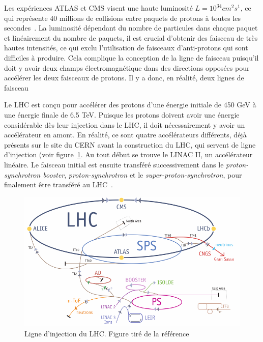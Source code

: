 Les expériences ATLAS et CMS visent une haute luminosité
$L = 10^{34} cm^2 s^1$, ce qui représente 40 millions de collisions
entre paquets de protons à toutes les
secondes~\cite{collaboration_atlas_2008}. La luminosité dépendant du
nombre de particules dans chaque paquet et linéairement du nombre de
paquets, il est crucial d'obtenir des faisceau de très hautes
intensités, ce qui exclu l'utilisation de faisceaux d'anti-protons
qui sont difficiles à produire. Cela complique la conception de la
ligne de faisceau puisqu'il doit y avoir deux champs électromagnétique
dans des directions opposées pour accélérer les deux faisceaux de
protons. Il y a donc, en réalité, deux lignes de faisceau%


Le LHC est conçu pour accélérer des protons d'une énergie initiale de
450 GeV à une énergie finale de 6.5 TeV. Puisque les protons doivent
avoir une énergie considérable dès leur injection dans le LHC, il doit
nécessairement y avoir un accélérateur en amont. En réalité, ce sont
quatre accélérateurs différents, déjà présents sur le site du CERN
avant la construction du LHC, qui servent de ligne d'injection (voir
figure~\ref{fig:lhc_injection}. Au tout début se trouve le LINAC II,
un accélérateur linéaire. Le faisceau initial est ensuite transféré
successivement dans le \emph{proton-synchrotron booster},
\emph{proton-synchrotron} et le \emph{super-proton-synchrotron}, pour
finalement être transféré au LHC~\cite{evans_lhc_2008}.

\begin{figure}
  \centering
  \includegraphics{lhc_injection.pdf}
  \caption{Ligne d'injection du LHC. Figure tiré de la
    référence~\cite{Lefevre:1165534}}
  \label{fig:lhc_injection}
\end{figure}

